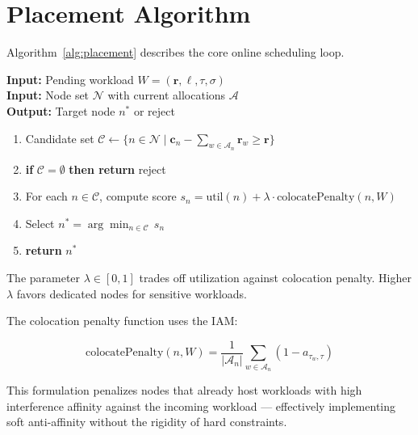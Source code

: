 \section{Placement Algorithm}

\vspace{6pt}
Algorithm~\ref{alg:placement} describes the core online scheduling loop.

\begin{tcolorbox}[colback=white,colframe=uwaterlooNavy,title={\textbf{Algorithm 1:} EdgeSched Online Placement}]
\label{alg:placement}
\textbf{Input:} Pending workload \(W = (\mathbf{r}, \ell, \tau, \sigma)\)\\
\textbf{Input:} Node set \(\mathcal{N}\) with current allocations \(\mathcal{A}\)\\
\textbf{Output:} Target node \(n^*\) or reject
\vspace{4pt}
\begin{enumerate}[leftmargin=*,nosep]
    \item Candidate set \(\mathcal{C} \leftarrow \{n \in \mathcal{N} \mid \mathbf{c}_n - \sum_{w \in \mathcal{A}_n} \mathbf{r}_w \geq \mathbf{r}\}\)
    \item \textbf{if} \(\mathcal{C} = \emptyset\) \textbf{then return} reject
    \item For each \(n \in \mathcal{C}\), compute score
          \(s_n = \text{util}(n) + \lambda \cdot \text{colocatePenalty}(n, W)\)
    \item Select \(n^* = \arg\min_{n \in \mathcal{C}} \, s_n\)
    \item \textbf{return} \(n^*\)
\end{enumerate}
\vspace{4pt}
{\small The parameter \(\lambda \in [0, 1]\) trades off utilization against colocation penalty. Higher \(\lambda\) favors dedicated nodes for sensitive workloads.}
\end{tcolorbox}

\vspace{6pt}
The colocation penalty function uses the IAM:

\[
\text{colocatePenalty}(n, W) =
\frac{1}{|\mathcal{A}_n|} \sum_{w \in \mathcal{A}_n} (1 - a_{\tau_w, \tau})
\]

This formulation penalizes nodes that already host workloads with high interference affinity against the incoming workload --- effectively implementing soft anti-affinity without the rigidity of hard constraints.
